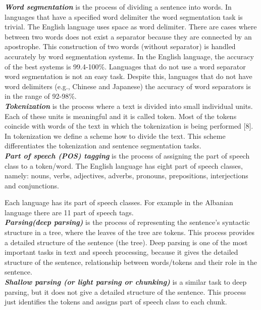 \emph{ \textbf{ Word segmentation}} is the process of dividing a sentence into words. In languages that have a specified word delimiter the word segmentation task is trivial. The English language uses space as word delimiter. There are cases where between  two words does not exist a separator because they are connected by an apostrophe. This construction of two words (without separator) is handled accurately by word segmentation systems. In the English language, the accuracy of the best systems is 99.4-100\%. Languages that do not use a word separator word segmentation is not an easy task. Despite this, languages that do not have word delimiters (e.g., Chinese and Japanese) the accuracy of word separators is in the range of 92-98\%.\\

\emph{ \textbf{Tokenization}} is the process where a text is divided into small individual units. Each of these units is meaningful and it is called token. Most of the tokens coincide with words of the text in which the tokenization is being performed [8]. In tokenization we define a scheme how to divide the text. This scheme differentiates the tokenization and sentence segmentation tasks. \\ %

\emph{ \textbf{Part of speech (POS) tagging}} is the process of assigning the part of speech class to a token/word. The English language has eight part of speech classes, namely: nouns, verbs, adjectives, adverbs, pronouns, prepositions, interjections and conjunctions.

Each language has its part of speech classes. For example in the Albanian language there are 11 part of speech tags.\\

\emph{ \textbf{Parsing(deep parsing)}} is the process of representing the sentence's syntactic structure in a tree, where the leaves of the tree are tokens. This process provides a detailed structure of the sentence (the tree). Deep parsing is one of the most important tasks in text and speech processing, because it gives the detailed structure of the sentence, relationship between words/tokens and their role in the sentence.\\

\emph{ \textbf{Shallow parsing (or light parsing or chunking)}} is a similar task to deep parsing, but it does not give a detailed structure of the sentence. This process just identifies the tokens and assigns part of speech class to each chunk.\\

